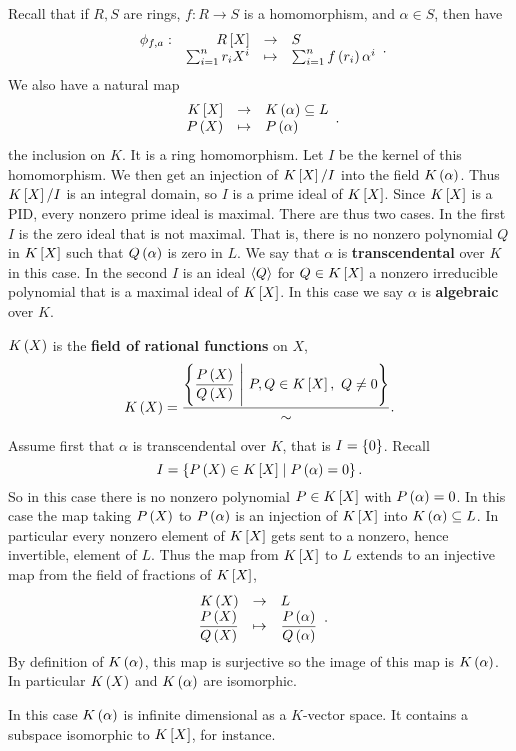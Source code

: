 Recall that if $ R, S $ are rings, $ f : R \to S $ is a homomorphism, and $ \alpha \in S $, then have
$$ \function[\phi_{f, a}]{R\sb{X}}{S}{\sum_{i = 1}^n r_iX^i}{\sum_{i = 1}^n f\rb{r_i}\alpha^i}. $$
We also have a natural map
$$ \function{K\sb{X}}{K\rb{\alpha} \subseteq L}{P\rb{X}}{P\rb{\alpha}}. $$
the inclusion on $ K $. It is a ring homomorphism. Let $ I $ be the kernel of this homomorphism. We then get an injection of $ K\sb{X} / I $ into the field $ K\rb{\alpha} $. Thus $ K\sb{X} / I $ is an integral domain, so $ I $ is a prime ideal of $ K\sb{X} $. Since $ K\sb{X} $ is a PID, every nonzero prime ideal is maximal. There are thus two cases. In the first $ I $ is the zero ideal that is not maximal. That is, there is no nonzero polynomial $ Q $ in $ K\sb{X} $ such that $ Q\rb{\alpha} $ is zero in $ L $. We say that $ \alpha $ is \textbf{transcendental} over $ K $ in this case. In the second $ I $ is an ideal $ \ab{Q} $ for $ Q \in K\sb{X} $ a nonzero irreducible polynomial that is a maximal ideal of $ K\sb{X} $. In this case we say $ \alpha $ is \textbf{algebraic} over $ K $.

\begin{definition}
$ K\rb{X} $ is the \textbf{field of rational functions} on $ X $,
$$ K\rb{X} = \dfrac{\cb{\dfrac{P\rb{X}}{Q\rb{X}} \ \Bigg| \ P, Q \in K\sb{X}, \ Q \ne 0}}{\sim}. $$
\end{definition}

Assume first that $ \alpha $ is transcendental over $ K $, that is $ I = \cb{0} $. Recall
$$ I = \cb{P\rb{X} \in K\sb{X} \mid P\rb{\alpha} = 0}. $$
So in this case there is no nonzero polynomial $ P \in K\sb{X} $ with $ P\rb{\alpha} = 0 $. In this case the map taking $ P\rb{X} $ to $ P\rb{\alpha} $ is an injection of $ K\sb{X} $ into $ K\rb{\alpha} \subseteq L $. In particular every nonzero element of $ K\sb{X} $ gets sent to a nonzero, hence invertible, element of $ L $. Thus the map from $ K\sb{X} $ to $ L $ extends to an injective map from the field of fractions of $ K\sb{X} $,
$$ \function{K\rb{X}}{L}{\dfrac{P\rb{X}}{Q\rb{X}}}{\dfrac{P\rb{\alpha}}{Q\rb{\alpha}}}. $$
By definition of $ K\rb{\alpha} $, this map is surjective so the image of this map is $ K\rb{\alpha} $. In particular $ K\rb{X} $ and $ K\rb{\alpha} $ are isomorphic.

\begin{note*}
In this case $ K\rb{\alpha} $ is infinite dimensional as a $ K $-vector space. It contains a subspace isomorphic to $ K\sb{X} $, for instance.
\end{note*}

